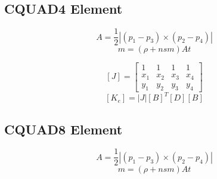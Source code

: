    \subsection{CQUAD4 Element}
     \[ A = \frac{1}{2} |(p_1-p_3) \times (p_2-p_4)| \]
     \[ m = (\rho +nsm) A t \]

    \[ [J] = \left[ \begin{array}{cccc}
               1 &     1 & 1   & 1   \\
               x_1 & x_2 & x_3 & x_4 \\
               y_1 & y_2 & y_3 & y_4 
            \end{array}\right]\]
     \[  [K_e] = |J| [B]^T [D] [B] \]

   \subsection{CQUAD8 Element}
     \[ A = \frac{1}{2} |(p_1-p_3) \times (p_2-p_4)| \]
     \[ m = (\rho +nsm) A t \]

